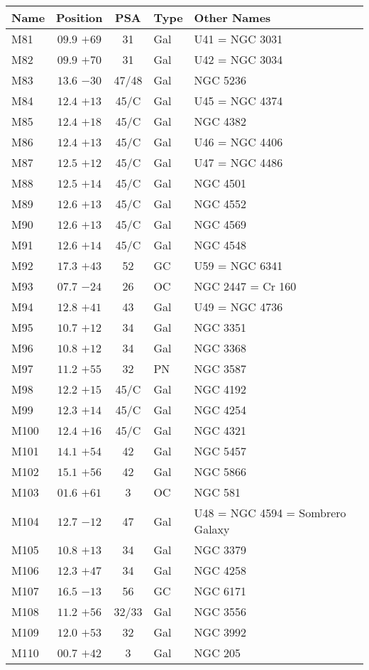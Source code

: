 \begin{table}[t]
\setlength{\tabcolsep}{3pt}
\small
\begin{tabular}{lcclll}
\hline
Name&Position&PSA&Type&Other Names\\
\hline
M81  &$09.9$ $+69$&31&Gal&U41 = NGC 3031\\
M82  &$09.9$ $+70$&31&Gal&U42 = NGC 3034\\
M83  &$13.6$ $-30$&47/48&Gal&NGC 5236\\
M84  &$12.4$ $+13$&45/C&Gal&U45 = NGC 4374\\
M85  &$12.4$ $+18$&45/C&Gal&NGC 4382\\
M86  &$12.4$ $+13$&45/C&Gal&U46 = NGC 4406\\
M87  &$12.5$ $+12$&45/C&Gal&U47 = NGC 4486\\
M88  &$12.5$ $+14$&45/C&Gal&NGC 4501\\
M89  &$12.6$ $+13$&45/C&Gal&NGC 4552\\
M90  &$12.6$ $+13$&45/C&Gal&NGC 4569\\
M91  &$12.6$ $+14$&45/C&Gal&NGC 4548\\
M92  &$17.3$ $+43$&52&GC &U59 = NGC 6341\\
M93  &$07.7$ $-24$&26&OC &NGC 2447 = Cr 160\\
M94  &$12.8$ $+41$&43&Gal&U49 = NGC 4736\\
M95  &$10.7$ $+12$&34&Gal&NGC 3351\\
M96  &$10.8$ $+12$&34&Gal&NGC 3368\\
M97  &$11.2$ $+55$&32&PN &NGC 3587\\
M98  &$12.2$ $+15$&45/C&Gal&NGC 4192\\
M99  &$12.3$ $+14$&45/C&Gal&NGC 4254\\
M100 &$12.4$ $+16$&45/C&Gal&NGC 4321\\
M101 &$14.1$ $+54$&42&Gal&NGC 5457\\
M102 &$15.1$ $+56$&42&Gal&NGC 5866\\
M103 &$01.6$ $+61$&3&OC &NGC 581\\
M104 &$12.7$ $-12$&47&Gal&U48 = NGC 4594 = Sombrero Galaxy\\
M105 &$10.8$ $+13$&34&Gal&NGC 3379\\
M106 &$12.3$ $+47$&34&Gal&NGC 4258\\
M107 &$16.5$ $-13$&56&GC &NGC 6171\\
M108 &$11.2$ $+56$&32/33&Gal&NGC 3556\\
M109 &$12.0$ $+53$&32&Gal&NGC 3992\\
M110 &$00.7$ $+42$&3&Gal&NGC 205\\
\hline
\end{tabular}
\end{table}

